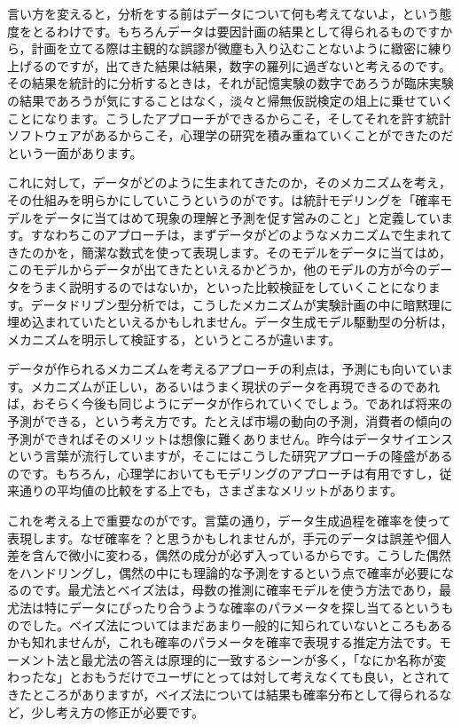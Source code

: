 \documentclass{ltjsbook}
\begin{document}
言い方を変えると，分析をする前はデータについて何も考えてないよ，という態度をとるわけです。もちろんデータは要因計画の結果として得られるものですから，計画を立てる際は主観的な誤謬が微塵も入り込むことないように緻密に練り上げるのですが，出てきた結果は結果，数字の羅列に過ぎないと考えるのです。その結果を統計的に分析するときは，それが記憶実験の数字であろうが臨床実験の結果であろうが気にすることはなく，淡々と帰無仮説検定の俎上に乗せていくことになります。こうしたアプローチができるからこそ，そしてそれを許す統計ソフトウェアがあるからこそ，心理学の研究を積み重ねていくことができたのだという一面があります。

これに対して，データがどのように生まれてきたのか，そのメカニズムを考え，その仕組みを明らかにしていこうというのがです。\textcite{Matsuura201610}は統計モデリングを「確率モデルをデータに当てはめて現象の理解と予測を促す営みのこと」と定義しています。すなわちこのアプローチは，まずデータがどのようなメカニズムで生まれてきたのかを，簡潔な数式を使って表現します。そのモデルをデータに当てはめ，このモデルからデータが出てきたといえるかどうか，他のモデルの方が今のデータをうまく説明するのではないか，といった比較検証をしていくことになります。データドリブン型分析では，こうしたメカニズムが実験計画の中に暗黙理に埋め込まれていたといえるかもしれません。データ生成モデル駆動型の分析は，メカニズムを明示して検証する，というところが違います。

データが作られるメカニズムを考えるアプローチの利点は，予測にも向いています。メカニズムが正しい，あるいはうまく現状のデータを再現できるのであれば，おそらく今後も同じようにデータが作られていくでしょう。であれば将来の予測ができる，という考え方です。たとえば市場の動向の予測，消費者の傾向の予測ができればそのメリットは想像に難くありません。昨今はデータサイエンスという言葉が流行していますが，そこにはこうした研究アプローチの隆盛があるのです。もちろん，心理学においてもモデリングのアプローチは有用ですし，従来通りの平均値の比較をする上でも，さまざまなメリットがあります。

これを考える上で重要なのがです。言葉の通り，データ生成過程を確率を使って表現します。なぜ確率を？と思うかもしれませんが，手元のデータは誤差や個人差を含んで微小に変わる，偶然の成分が必ず入っているからです。こうした偶然をハンドリングし，偶然の中にも理論的な予測をするという点で確率が必要になるのです。最尤法とベイズ法は，母数の推測に確率モデルを使う方法であり，最尤法は特にデータにぴったり合うような確率のパラメータを探し当てるというものでした。ベイズ法についてはまだあまり一般的に知られていないところもあるかも知れませんが，これも確率のパラメータを確率で表現する推定方法です。モーメント法と最尤法の答えは原理的に一致するシーンが多く，「なにか名称が変わったな」とおもうだけでユーザにとっては対して考えなくても良い，とされてきたところがありますが，ベイズ法については結果も確率分布として得られるなど，少し考え方の修正が必要です。
\end{document}
